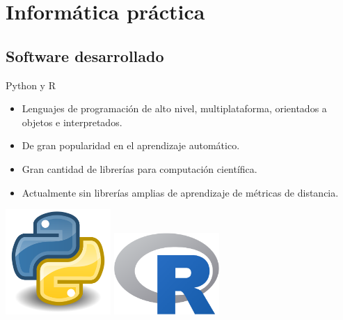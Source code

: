 \documentclass[10pt, compress]{beamer}
\begin{document}

\section{Informática práctica}

\subsection{Software desarrollado}

\begin{frame}{Python y R}
  \begin{itemize}
    \item Lenguajes de programación de alto nivel, multiplataforma, orientados a objetos e interpretados.
    \item De gran popularidad en el aprendizaje automático.
    \item Gran cantidad de librerías para computación científica.
    \item Actualmente sin librerías amplias de aprendizaje de métricas de distancia.
  \end{itemize}
  \begin{center}
    \includegraphics[width=0.3\textwidth]{images/Python.png}
    \hspace{0.2\textwidth}
    \includegraphics[width=0.3\textwidth]{images/R_logo.png}
  \end{center}
\end{frame}
\end{document}
